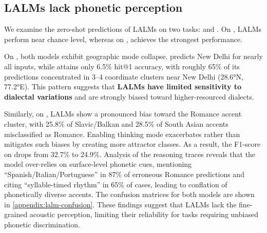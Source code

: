 \subsection{LALMs lack phonetic perception}
\label{sec:mallm}
We examine the zero-shot predictions of LALMs on two tasks: \geov and \eda. 
On \geov, LALMs perform near chance level, whereas on \eda, \gemini achieves the strongest performance.

On \geov, both models exhibit geographic mode collapse. 
\qweni predicts New Delhi for nearly all inputs, while \gemini attains only 6.5\% hit@1 accuracy, with roughly 65\% of its predictions concentrated in 3–4 coordinate clusters near New Delhi (28.6°N, 77.2°E). 
This pattern suggests that \textbf{LALMs have limited sensitivity to dialectal variations} and are strongly biased toward higher-resourced dialects.

Similarly, on \eda, LALMs show a pronounced bias toward the Romance accent cluster, with 25.8\% of Slavic/Balkan and 28.5\% of South Asian accents misclassified as Romance.
Enabling thinking mode exacerbates rather than mitigates such biases by creating more attractor classes.
As a result, the F1-score on \eda drops from 32.7\% to 24.9\%.
Analysis of the reasoning traces reveals that the model over-relies on surface-level phonetic cues, mentioning ``Spanish/Italian/Portuguese'' in 87\% of erroneous Romance predictions and citing ``syllable-timed rhythm'' in 65\% of cases, leading to conflation of phonetically diverse accents.
The confusion matrices for both models are shown in \autoref{appendix:lalm-confusion}.
These findings suggest that LALMs lack the fine-grained acoustic perception, limiting their reliability for tasks requiring unbiased phonetic discrimination.